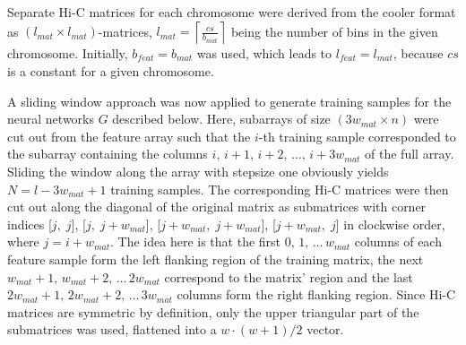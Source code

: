 Separate Hi-C matrices for each chromosome were derived from the cooler format as $(l_\mathit{mat} \times l_\mathit{mat})$-matrices, 
$l_\mathit{mat}=\left \lceil{\frac{cs}{b_\mathit{mat}}}\right \rceil$ being the number of bins in the given chromosome. 
Initially, $b_\mathit{feat} = b_\mathit{mat}$ was used, which leads to $l_\mathit{feat} = l_\mathit{mat}$, because $cs$ is a constant for a given chromosome.

A sliding window approach was now applied to generate training samples for the neural networks $G$ described below.
Here, subarrays of size $(3w_\mathit{mat} \times n)$ were cut out from the feature array 
such that the $i$-th training sample corresponded to the subarray containing the columns $i,\,i+1,\,i+2,\,\dots,\,i+3w_\mathit{mat}$ of the full array. 
Sliding the window along the array with stepsize one obviously yields $N=l-3w_\mathit{mat}+1$ training samples.
The corresponding Hi-C matrices were then cut out along the diagonal of the original matrix 
as submatrices with corner indices [$j,\;j$], [$j,\;j+w_\mathit{mat}$], [$j+w_\mathit{mat},\;j+w_\mathit{mat}$], [$j+w_\mathit{mat},\;j$] in clockwise order, where $j=i+w_\mathit{mat}$.
The idea here is that the first $0,\,1,\,\dots \,w_\mathit{mat}$ columns of each feature sample form the left flanking region of the training matrix, 
the next $w_\mathit{mat}+1,\,w_\mathit{mat}+2,\,\dots \,2w_\mathit{mat}$ correspond to the matrix' region and the last $2w_\mathit{mat}+1,\,2w_\mathit{mat}+2,\,\dots \,3w_\mathit{mat}$ columns form the right flanking region.
Since Hi-C matrices are symmetric by definition, only the upper triangular part of the submatrices was used, 
flattened into a $w\cdot (w+1)/2$ vector.

